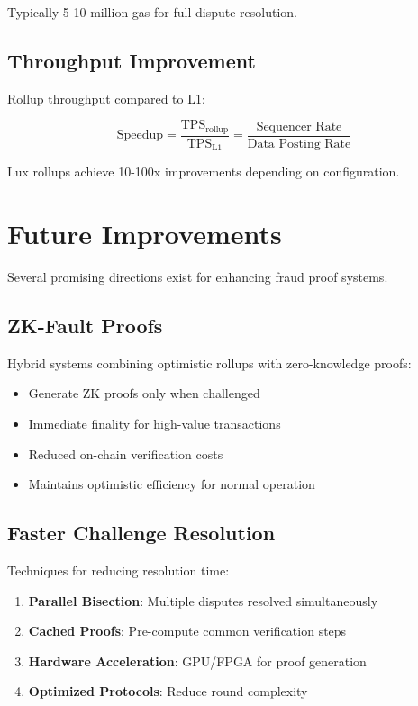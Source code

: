 \documentclass[11pt,a4paper]{article}
\theoremstyle{definition}
\begin{document}
Typically 5-10 million gas for full dispute resolution.

\subsection{Throughput Improvement}

Rollup throughput compared to L1:

\begin{equation}
\text{Speedup} = \frac{\text{TPS}_{\text{rollup}}}{\text{TPS}_{\text{L1}}} = \frac{\text{Sequencer Rate}}{\text{Data Posting Rate}}
\end{equation}

Lux rollups achieve 10-100x improvements depending on configuration.

\section{Future Improvements}

Several promising directions exist for enhancing fraud proof systems.

\subsection{ZK-Fault Proofs}

Hybrid systems combining optimistic rollups with zero-knowledge proofs:

\begin{itemize}
    \item Generate ZK proofs only when challenged
    \item Immediate finality for high-value transactions
    \item Reduced on-chain verification costs
    \item Maintains optimistic efficiency for normal operation
\end{itemize}

\subsection{Faster Challenge Resolution}

Techniques for reducing resolution time:

\begin{enumerate}
    \item \textbf{Parallel Bisection}: Multiple disputes resolved simultaneously
    \item \textbf{Cached Proofs}: Pre-compute common verification steps
    \item \textbf{Hardware Acceleration}: GPU/FPGA for proof generation
    \item \textbf{Optimized Protocols}: Reduce round complexity
\end{enumerate}
\end{document}
